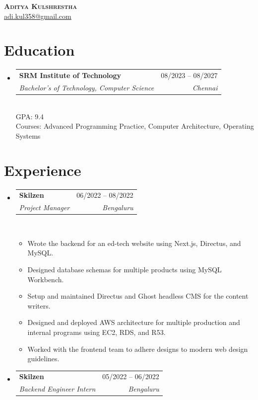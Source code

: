 \documentclass[letterpaper,11pt]{article}
\makeatletter
\newcommand{\resumeItem}[1]{%
\item\small{#1\vspace{-2pt}}%
}
\newcommand{\resumeSubheading}[4]{%
\vspace{-2pt}\item
\begin{tabular*}{0.97\textwidth}[t]{l@{\extracolsep{\fill}}r}
\textbf{#1} & #3 \\
\textit{\small #2} & \textit{\small #4} \\
\end{tabular*}
}
\newcommand{\resumeSubHeadingListStart}{\begin{itemize}[leftmargin=0.15in, label={}]}
\newcommand{\resumeSubHeadingListEnd}{\end{itemize}}
\newcommand{\resumeItemListStart}{\vspace{-5pt}\begin{itemize}}
\newcommand{\resumeItemListEnd}{\end{itemize}\vspace{-5pt}}
\makeatother
\begin{document}
{\centering
\textbf{\Huge \scshape Aditya Kulshrestha} \\ \vspace{1pt}
\small
\href{mailto:adi.kul358@gmail.com}{\underline{adi.kul358@gmail.com}}



}

\section{Education}
\resumeSubHeadingListStart
    \resumeSubheading
    {SRM Institute of Technology}
    {Bachelor's of Technology, Computer Science}
    {08/2023 -- 08/2027}
    {Chennai}\\
    {\small GPA: 9.4\\Courses: Advanced Programming Practice, Computer Architecture, Operating Systems}
\resumeSubHeadingListEnd

\section{Experience}
\resumeSubHeadingListStart
    \resumeSubheading
    {Skilzen}
    {Project Manager}
    {06/2022 -- 08/2022}
    {Bengaluru}\\
        \resumeItemListStart
            \resumeItem{Wrote the backend for an ed-tech website using Next.js, Directus, and MySQL.}
            \resumeItem{Designed database schemas for multiple products using MySQL Workbench.}
            \resumeItem{Setup and maintained Directus and Ghost headless CMS for the content writers.}
            \resumeItem{Designed and deployed AWS architecture for multiple production and internal programs using EC2, RDS, and R53.}
            \resumeItem{Worked with the frontend team to adhere designs to modern web design guidelines.}
        \resumeItemListEnd
    \resumeSubheading
    {Skilzen}
    {Backend Engineer Intern}
    {05/2022 -- 06/2022}
    {Bengaluru}\\
\resumeSubHeadingListEnd

\end{document}
